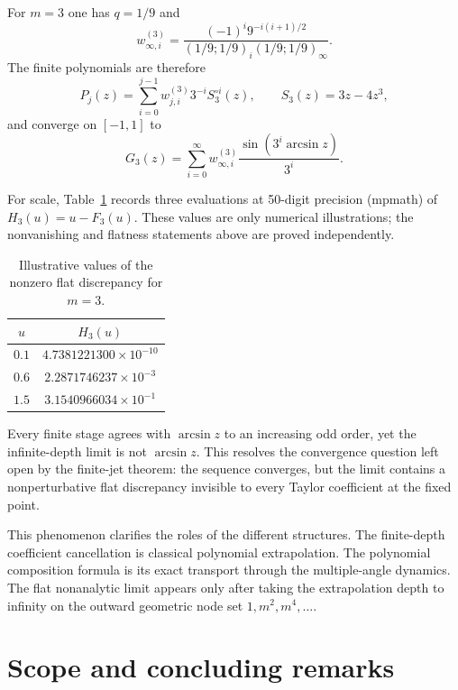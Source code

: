 \documentclass[11pt]{article}
\theoremstyle{remark}
\begin{document}
For $m=3$ one has $q=1/9$ and
\begin{equation}
w^{(3)}_{\infty,i}
=
\frac{(-1)^i 9^{-i(i+1)/2}}
{(1/9;1/9)_i(1/9;1/9)_\infty}.
\label{eq:cubicweights}
\end{equation}
The finite polynomials are therefore
\begin{equation}
P_j(z)
=
\sum_{i=0}^{j-1}w^{(3)}_{j,i}3^{-i}S_3^{\circ i}(z),
\qquad
S_3(z)=3z-4z^3,
\label{eq:cubiciterate}
\end{equation}
and converge on $[-1,1]$ to
\begin{equation}
G_3(z)
=
\sum_{i=0}^{\infty}w^{(3)}_{\infty,i}
\frac{\sin(3^i\arcsin z)}{3^i}.
\label{eq:cubiclimit}
\end{equation}

For scale, Table~\ref{tab:flatgap} records three evaluations at 50-digit precision (mpmath)
of $H_3(u)=u-F_3(u)$.  These values are only numerical illustrations; the
nonvanishing and flatness statements above are proved independently.
\begin{table}[ht]
\centering
\begin{tabular}{@{}cc@{}}
\toprule
$u$ & $H_3(u)$ \\
\midrule
$0.1$ & $4.7381221300\times10^{-10}$ \\
$0.6$ & $2.2871746237\times10^{-3}$ \\
$1.5$ & $3.1540966034\times10^{-1}$ \\
\bottomrule
\end{tabular}
\caption{Illustrative values of the nonzero flat discrepancy for $m=3$.}
\label{tab:flatgap}
\end{table}
Every finite stage agrees with $\arcsin z$ to an increasing odd order, yet the
infinite-depth limit is not $\arcsin z$.  This resolves the convergence question
left open by the finite-jet theorem: the sequence converges, but the limit
contains a nonperturbative flat discrepancy invisible to every Taylor
coefficient at the fixed point.

This phenomenon clarifies the roles of the different structures.  The
finite-depth coefficient cancellation is classical polynomial extrapolation.
The polynomial composition formula is its exact transport through the
multiple-angle dynamics.  The flat nonanalytic limit appears only after taking
the extrapolation depth to infinity on the outward geometric node set
$1,m^2,m^4,\ldots$.

\section{Scope and concluding remarks}
\end{document}
